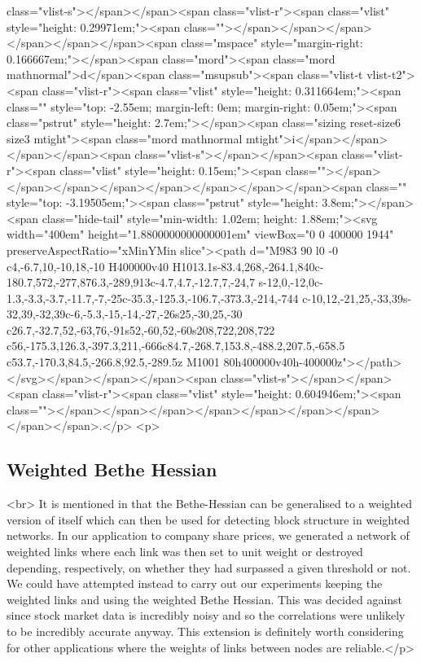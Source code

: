class="vlist-s">​</span></span><span class="vlist-r"><span class="vlist" style="height: 0.29971em;"><span class=""></span></span></span></span></span></span><span class="mspace" style="margin-right: 0.166667em;"></span><span class="mord"><span class="mord mathnormal">d</span><span class="msupsub"><span class="vlist-t vlist-t2"><span class="vlist-r"><span class="vlist" style="height: 0.311664em;"><span class="" style="top: -2.55em; margin-left: 0em; margin-right: 0.05em;"><span class="pstrut" style="height: 2.7em;"></span><span class="sizing reset-size6 size3 mtight"><span class="mord mathnormal mtight">i</span></span></span></span><span class="vlist-s">​</span></span><span class="vlist-r"><span class="vlist" style="height: 0.15em;"><span class=""></span></span></span></span></span></span></span></span><span class="" style="top: -3.19505em;"><span class="pstrut" style="height: 3.8em;"></span><span class="hide-tail" style="min-width: 1.02em; height: 1.88em;"><svg width="400em" height="1.8800000000000001em" viewBox="0 0 400000 1944" preserveAspectRatio="xMinYMin slice"><path d="M983 90
l0 -0
c4,-6.7,10,-10,18,-10 H400000v40
H1013.1s-83.4,268,-264.1,840c-180.7,572,-277,876.3,-289,913c-4.7,4.7,-12.7,7,-24,7
s-12,0,-12,0c-1.3,-3.3,-3.7,-11.7,-7,-25c-35.3,-125.3,-106.7,-373.3,-214,-744
c-10,12,-21,25,-33,39s-32,39,-32,39c-6,-5.3,-15,-14,-27,-26s25,-30,25,-30
c26.7,-32.7,52,-63,76,-91s52,-60,52,-60s208,722,208,722
c56,-175.3,126.3,-397.3,211,-666c84.7,-268.7,153.8,-488.2,207.5,-658.5
c53.7,-170.3,84.5,-266.8,92.5,-289.5z
M1001 80h400000v40h-400000z"></path></svg></span></span></span><span class="vlist-s">​</span></span><span class="vlist-r"><span class="vlist" style="height: 0.604946em;"><span class=""></span></span></span></span></span></span></span></span></span>.</p>
<p>\subsection{Weighted Bethe Hessian}<br>
It is mentioned in \cite{SaadeBethe} that the Bethe-Hessian can be generalised to a weighted version of itself which can then be used for detecting block structure in weighted networks. In our application to company share prices, we generated a network of weighted links where each link was then set to unit weight or destroyed depending, respectively, on whether they had surpassed a given threshold or not. We could have attempted instead to carry out our experiments keeping the weighted links and using the weighted Bethe Hessian. This was decided against since stock market data is incredibly noisy and so the correlations were unlikely to be incredibly accurate anyway. This extension is definitely worth considering for other applications where the weights of links between nodes are reliable.</p>
